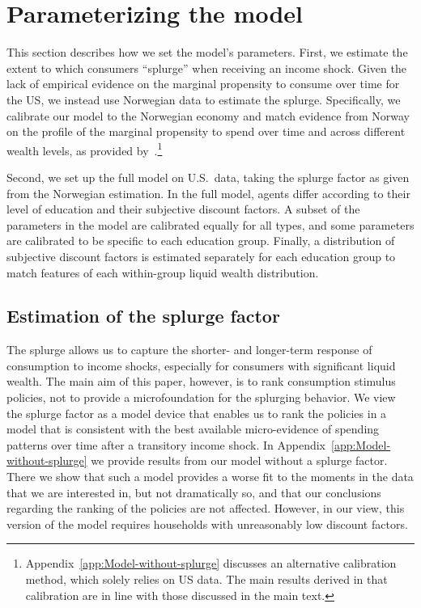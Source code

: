 \documentclass{econsocart}
\begin{document}
\section{Parameterizing the model}
\whenintegrated{\label{sec:parameters}}

This section describes how we set the model's parameters. First, we estimate the extent to which consumers ``splurge'' when receiving an income shock. Given the lack of empirical evidence on the marginal propensity to consume over time for the US, we instead use Norwegian data to estimate the splurge. Specifically, we calibrate our model to the Norwegian economy and match evidence from Norway on the profile of the marginal propensity to spend over time and across different wealth levels, as provided by~\cite{fagereng-mpc-2021}.\footnote{Appendix~\ref{app:Model-without-splurge} discusses an alternative calibration method, which solely relies on US data. The main results derived in that calibration are in line with those discussed in the main text.}

Second, we set up the full model on U.S.\ data, taking the splurge factor as given from the Norwegian estimation. In the full model, agents differ according to their level of education and their subjective discount factors. A subset of the parameters in the model are calibrated equally for all types, and some parameters are calibrated to be specific to each education group. Finally, a distribution of subjective discount factors is estimated separately for each education group to match features of each within-group liquid wealth distribution.

\subsection{Estimation of the splurge factor}
\whenintegrated{\label{sec:splurge}}

The splurge allows us to capture the shorter- and longer-term response of consumption to income shocks, especially for consumers with significant liquid wealth. The main aim of this paper, however, is to rank consumption stimulus policies, not to provide a microfoundation for the splurging behavior. We view the splurge factor as a model device that enables us to rank the policies in a model that is consistent with the best available micro-evidence of spending patterns over time after a transitory income shock. In Appendix~\ref{app:Model-without-splurge} we provide results from our model without a splurge factor. There we show that such a model provides a worse fit to the moments in the data that we are interested in, but not dramatically so, and that our conclusions regarding the ranking of the policies are not affected. However, in our view, this version of the model requires households with unreasonably low discount factors.
\end{document}
